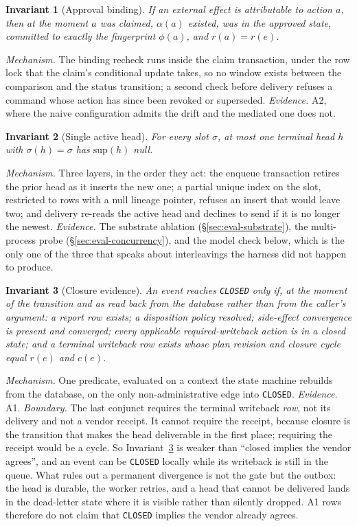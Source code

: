 \documentclass[acmsmall,manuscript,review,anonymous]{acmart}
\renewcommand{\_}{\discretionary{\textunderscore}{}{\textunderscore}}
\newtheorem{invariant}{Invariant}
\begin{document}
\begin{invariant}[Approval binding]
\label{inv:bind}
If an external effect is attributable to action $a$, then at the moment $a$ was
claimed, $\alpha(a)$ existed, was in the approved state, committed to exactly
the fingerprint $\phi(a)$, and $r(a)=r(e)$.
\end{invariant}

\noindent\emph{Mechanism.} The binding recheck runs inside the claim
transaction, under the row lock that the claim's conditional update takes, so no
window exists between the comparison and the status transition; a second check
before delivery refuses a command whose action has since been revoked or
superseded. \emph{Evidence.} A2, where the naive configuration admits the drift
and the mediated one does not.

\begin{invariant}[Single active head]
\label{inv:head}
For every slot $\sigma$, at most one terminal head $h$ with
$\sigma(h)=\sigma$ has $\mathrm{sup}(h)$ null.
\end{invariant}

\noindent\emph{Mechanism.} Three layers, in the order they act: the enqueue
transaction retires the prior head as it inserts the new one; a partial unique
index on the slot, restricted to rows with a null lineage pointer, refuses an
insert that would leave two; and delivery re-reads the active head and declines
to send if it is no longer the newest. \emph{Evidence.} The substrate ablation
(\S\ref{sec:eval-substrate}), the multi-process probe
(\S\ref{sec:eval-concurrency}), and the model check below, which is the only one
of the three that speaks about interleavings the harness did not happen to
produce.

\begin{invariant}[Closure evidence]
\label{inv:close}
An event reaches \texttt{CLOSED} only if, at the moment of the transition and as
read back from the database rather than from the caller's argument: a report row
exists; a disposition policy resolved; side-effect convergence is present and
converged; every applicable required-writeback action is in a closed state; and
a terminal writeback row exists whose plan revision and closure cycle equal
$r(e)$ and $c(e)$.
\end{invariant}

\noindent\emph{Mechanism.} One predicate, evaluated on a context the state
machine rebuilds from the database, on the only non-administrative edge into
\texttt{CLOSED}. \emph{Evidence.} A1. \emph{Boundary.} The last conjunct
requires the terminal writeback \emph{row}, not its delivery and not a vendor
receipt. It cannot require the receipt, because closure is the transition that
makes the head deliverable in the first place; requiring the receipt would be a
cycle. So Invariant~\ref{inv:close} is weaker than ``closed implies the vendor
agrees'', and an event can be \texttt{CLOSED} locally while its writeback is
still in the queue. What rules out a permanent divergence is not the gate but
the outbox: the head is durable, the worker retries, and a head that cannot be
delivered lands in the dead-letter state where it is visible rather than
silently dropped. {A1} rows therefore do not claim that \texttt{CLOSED}
implies the vendor already agrees.
\end{document}
